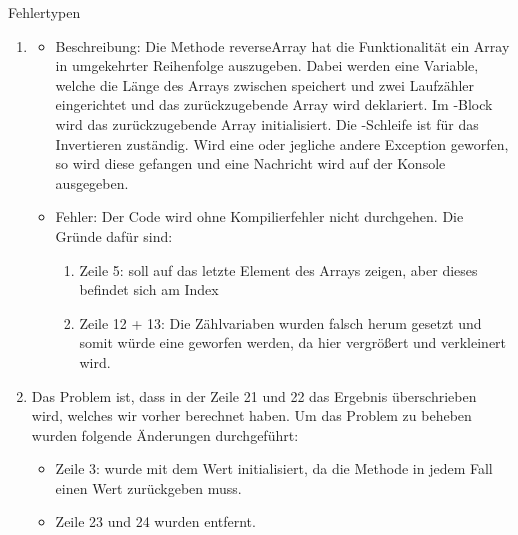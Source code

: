 \documentclass{../tuda-exercise}
\begin{document}
\begin{task}[credit=\stars{2}{3}]{Fehlertypen}
\begin{solution}
\begin{enumerate}
        \item
        \begin{itemize}
          \item Beschreibung:
          \newline
          Die Methode reverseArray hat die Funktionalität ein Array in umgekehrter Reihenfolge
          auszugeben. Dabei werden eine Variable, welche die Länge des Arrays zwischen speichert
          und zwei Laufzähler eingerichtet und das zurückzugebende Array wird deklariert. Im
          -Block wird das zurückzugebende Array initialisiert. Die
          -Schleife ist für das Invertieren zuständig. Wird eine
           oder jegliche andere Exception geworfen, so wird
          diese gefangen und eine Nachricht wird auf der Konsole ausgegeben.
          \item Fehler:
          \newline
          Der Code wird ohne Kompilierfehler nicht durchgehen. Die Gründe dafür sind:
          \begin{enumerate}
            \item Zeile 5:  soll auf das letzte Element des Arrays zeigen, aber
            dieses befindet sich am Index 
            \item Zeile 12 + 13: Die Zählvariaben wurden falsch herum gesetzt und somit würde eine
             geworfen werden, da hier 
            vergrößert und  verkleinert wird.
          \end{enumerate}
        \end{itemize}
        

        \clearpage

        \item Das Problem ist, dass in der Zeile 21 und 22 das Ergebnis überschrieben wird,
        welches wir vorher berechnet haben. Um das Problem zu beheben wurden folgende Änderungen
        durchgeführt:
        \begin{itemize}
          \item Zeile 3:  wurde mit dem Wert 
          initialisiert, da die Methode in jedem Fall einen Wert zurückgeben muss.
          \item Zeile 23 und 24 wurden entfernt.
        \end{itemize}
        
      \end{enumerate}
    \end{solution}
  \end{task}
\end{document}
